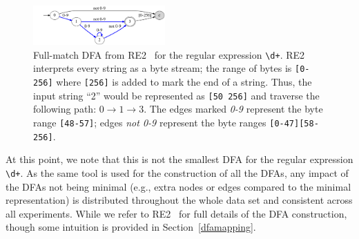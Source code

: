 \begin{figure}[t]
	\centering
	\includegraphics[width=0.45\textwidth]{figures/digits}
	\vspace{-12pt}
	\caption{Full-match DFA from RE2~\cite{re2} for the regular expression {\tt \textbackslash d+}. 
	RE2  interprets every string as a byte stream; the range of bytes is {\tt [0-256]} where {\tt [256]} is added to mark the end of a string. Thus, the input string ``2'' would be represented as {\tt [50 256]} and traverse the following path: $0 \rightarrow 1 \rightarrow 3$. 
	The edges marked \emph{0-9} represent the byte range {\tt [48-57]}; edges \emph{not 0-9} represent the byte ranges {\tt [0-47][58-256]}. }
	\label{fig:static}    
	\vspace{-6pt}
\end{figure}


At this point, we note that this is not the smallest DFA for the regular expression \verb!\d+!.  
As the same tool is used for the construction of all the  DFAs, any impact of the DFAs not being minimal  (e.g., extra nodes or edges compared to the minimal representation) is distributed throughout the whole data set and consistent across all experiments. 
While we refer to RE2~\cite{re2} for full details of the DFA construction, though some intuition is provided in Section~\ref{dfamapping}. 



